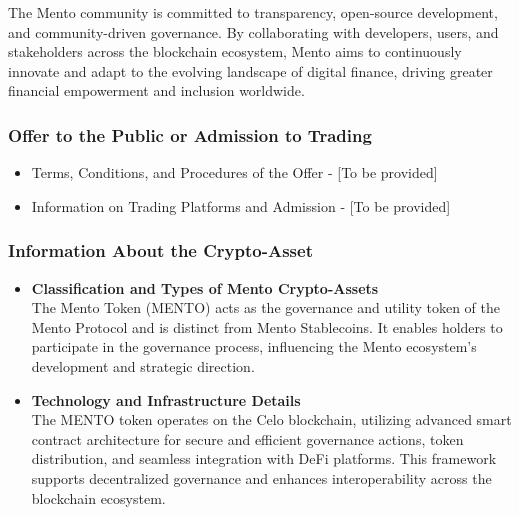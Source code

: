 \documentclass[a4paper]{article}
\theoremstyle{definition}
\begin{document}
\begin{appendices}
The Mento community is committed to transparency, open-source development, and community-driven governance. By collaborating with developers, users, and stakeholders across the blockchain ecosystem, Mento aims to continuously innovate and adapt to the evolving landscape of digital finance, driving greater financial empowerment and inclusion worldwide.

\subsubsection{Offer to the Public or Admission to Trading}
\begin{itemize}
    \item Terms, Conditions, and Procedures of the Offer - [To be provided]
    \item Information on Trading Platforms and Admission - [To be provided]
\end{itemize}

\subsubsection{Information About the Crypto-Asset}
\begin{itemize}
    \item \textbf{Classification and Types of Mento Crypto-Assets}\\
    The Mento Token (MENTO) acts as the governance and utility token of the Mento Protocol and is distinct from Mento Stablecoins. It enables holders to participate in the governance process, influencing the Mento ecosystem's development and strategic direction.

    \item \textbf{Technology and Infrastructure Details}\\
    The MENTO token operates on the Celo blockchain, utilizing advanced smart contract architecture for secure and efficient governance actions, token distribution, and seamless integration with DeFi platforms. This framework supports decentralized governance and enhances interoperability across the blockchain ecosystem.


\end{itemize}
\end{appendices}
\end{document}
